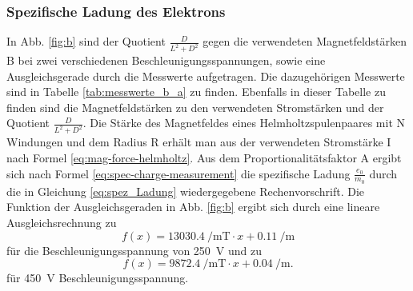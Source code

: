 \subsubsection{Spezifische Ladung des Elektrons}
%
In Abb. \ref{fig:b} sind der Quotient $\frac{D}{L^2 + D^2}$ gegen die verwendeten Magnetfeldstärken B bei zwei verschiedenen Beschleunigungsspannungen, sowie eine Ausgleichsgerade durch die Messwerte aufgetragen. Die dazugehörigen Messwerte sind in Tabelle \ref{tab:messwerte_b_a} zu finden. Ebenfalls in dieser Tabelle zu finden sind die Magnetfeldstärken zu den verwendeten Stromstärken und der Quotient $\frac{D}{L^2 + D^2}$. Die Stärke des Magnetfeldes eines Helmholtzspulenpaares mit N Windungen und dem Radius R erhält man aus der verwendeten Stromstärke I nach Formel \eqref{eq:mag-force-helmholtz}. Aus dem Proportionalitätsfaktor A ergibt sich nach Formel \eqref{eq:spec-charge-measurement} die spezifische Ladung $\frac{e_0}{m_0}$ durch die in Gleichung \eqref{eq:spez_Ladung} wiedergegebene Rechenvorschrift. Die Funktion der Ausgleichsgeraden in Abb. \ref{fig:b} ergibt sich durch eine lineare Ausgleichsrechnung zu 
%
\begin{equation*}
f(x) = \SI{13030.4}{\per\metre\tesla} \cdot x + \SI{0.11}{\per\metre}
\end{equation*}
für die Beschleunigungsspannung von \SI{250}{\volt} und zu
%
\begin{equation*}
f(x) = \SI{9872.4}{\per\metre\tesla} \cdot x +  \SI{0.04}{\per\metre}.
\end{equation*}
%
für \SI{450}{\volt} Beschleunigungsspannung.
%
